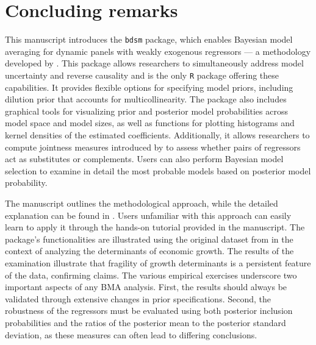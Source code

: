 \documentclass[a4paper]{article}
\begin{document}
\section{Concluding remarks}\label{sum}

This manuscript introduces the \verb+bdsm+ package, which enables Bayesian model averaging for dynamic panels with weakly exogenous regressors — a methodology developed by \citet{Moral+2012,Moral+2013,Moral+2016}.
This package allows researchers to simultaneously address model uncertainty and reverse causality and is the only \verb+R+ package offering these capabilities.
It provides flexible options for specifying model priors, including dilution prior that accounts for multicollinearity.
The package also includes graphical tools for visualizing prior and posterior model probabilities across model space and model sizes, as well as functions for plotting histograms and kernel densities of the estimated coefficients.
Additionally, it allows researchers to compute jointness measures introduced by \citet{Doppelhofer+2009,Ley+2007,Hofmarcher+2018} to assess whether pairs of regressors act as substitutes or complements.
Users can also perform Bayesian model selection to examine in detail the most probable models based on posterior model probability.

The manuscript outlines the methodological approach, while the detailed explanation can be found in \citet{Moral+2012,Moral+2013,Moral+2016}.
Users unfamiliar with this approach can easily learn to apply it through the hands-on tutorial provided in the manuscript.
The package’s functionalities are illustrated using the original dataset from \citet{Moral+2016} in the context of analyzing the determinants of economic growth.
The results of the examination illustrate that fragility of growth determinants is a persistent feature of the data, confirming \citet{Moral+2016} claims.
The various empirical exercises underscore two important aspects of any BMA analysis.
First, the results should always be validated through extensive changes in prior specifications.
Second, the robustness of the regressors must be evaluated using both
posterior inclusion probabilities and the ratios of the posterior mean to the posterior standard deviation,
as these measures can often lead to differing conclusions.




\end{document}
